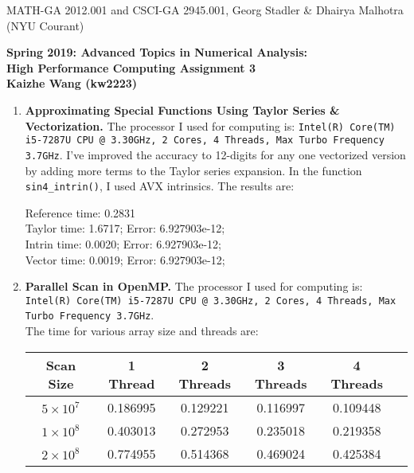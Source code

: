 \documentclass[12pt]{article}
\begin{document}
\begin{center}
  \vspace*{-2cm}
{\small MATH-GA 2012.001 and CSCI-GA 2945.001, Georg Stadler \&
  Dhairya Malhotra (NYU Courant)}
\end{center}
\vspace*{.5cm}
\begin{center}
\large \textbf{%
Spring 2019: Advanced Topics in Numerical Analysis: \\
High Performance Computing Assignment 3 \\
Kaizhe Wang (kw2223)}
\end{center}

\begin{enumerate}
  \item {\bf Approximating Special Functions Using Taylor Series \& Vectorization.}
  The processor I used for computing is: \texttt{Intel(R) Core(TM) i5-7287U CPU @ 3.30GHz, 2 Cores, 4 Threads, Max Turbo Frequency 3.7GHz}. I've improved the accuracy to 12-digits for any one vectorized version by adding more terms to the Taylor series expansion. In the function \texttt{sin4\_intrin()}, I used AVX intrinsics. The results are:
  
  Reference time: 0.2831\\
Taylor time:    1.6717;      Error: 6.927903e-12;\\
Intrin time:    0.0020;      Error: 6.927903e-12;\\
Vector time:    0.0019;      Error: 6.927903e-12;\\
    
  \item {\bf Parallel Scan in OpenMP.} 
  The processor I used for computing is: \texttt{Intel(R) Core(TM) i5-7287U CPU @ 3.30GHz, 2 Cores, 4 Threads, Max Turbo Frequency 3.7GHz}.  \\
  The time for various array size and threads are:
\begin{center}
\begin{tabular}{ |c|c|c|c|c|c| }
 \hline
 Scan Size & 1 Thread & 2 Threads & 3 Threads & 4 Threads\\
 \hline
         $5\times10^7$  & 0.186995 & 0.129221 & 0.116997 & 0.109448  \\
         $1\times10^8$  & 0.403013  & 0.272953 & 0.235018 & 0.219358 \\
       $2\times10^8$  & 0.774955 & 0.514368 & 0.469024 & 0.425384 \\
  \hline
\end{tabular}
\end{center}


\end{enumerate}
\end{document}
